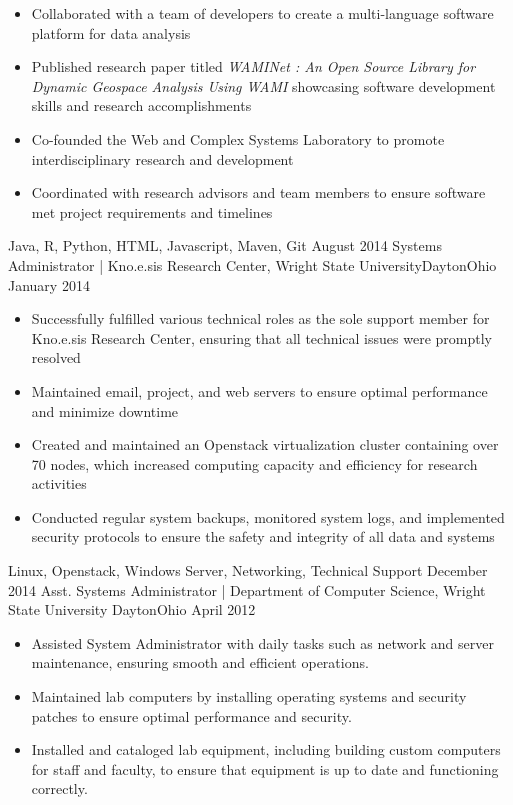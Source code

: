 \begin{experiences}
{\begin{itemize}
          \item Collaborated with a team of developers to create a multi-language software platform for data analysis
          \item Published research paper titled \textit{WAMINet : An Open Source Library for Dynamic Geospace Analysis Using WAMI} showcasing software development skills and research accomplishments
          \item Co-founded the Web and Complex Systems Laboratory to promote interdisciplinary research and development
          \item Coordinated with research advisors and team members to ensure software met project requirements and timelines
      \end{itemize}
  }
  {Java, R, Python, HTML, Javascript, Maven, Git}
  \emptySeparator
  \experience
  {August 2014} { Systems Administrator | Kno.e.sis Research Center, Wright State University}{Dayton}{Ohio}
  {January 2014} {
      \begin{itemize}
          \item Successfully fulfilled various technical roles as the sole support member for Kno.e.sis Research Center, ensuring that all technical issues were promptly resolved
          \item Maintained email, project, and web servers to ensure optimal performance and minimize downtime
          \item Created and maintained an Openstack virtualization cluster containing over 70 nodes, which increased computing capacity and efficiency for research activities
          \item Conducted regular system backups, monitored system logs, and implemented security protocols to ensure the safety and integrity of all data and systems
      \end{itemize}
  }
  {Linux, Openstack, Windows Server, Networking, Technical Support}
  \emptySeparator
  \experience
  {December 2014} { Asst. Systems Administrator | Department of Computer Science, Wright State University }{Dayton}{Ohio}
  {April 2012}    {
      \begin{itemize}
          \item Assisted System Administrator with daily tasks such as network and server maintenance, ensuring smooth and efficient operations.
          \item Maintained lab computers by installing operating systems and security patches to ensure optimal performance and security.
          \item Installed and cataloged lab equipment, including building custom computers for staff and faculty, to ensure that equipment is up to date and functioning correctly.

\end{itemize}}
\end{experiences}
